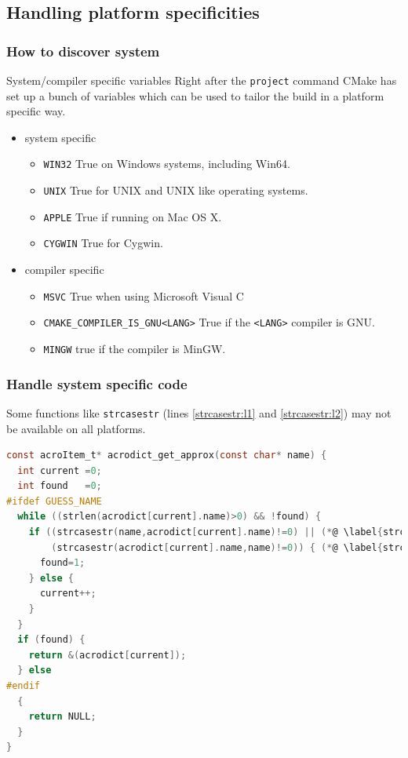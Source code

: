 \documentclass[compress,slidestop,table
              ]
               {beamer}
\begin{document}
\subsection{Handling platform specificities}
\begin{frame}[fragile]
\frametitle{How to discover system}
\begin{block}{System/compiler specific variables}
Right after the \lstinline!project! command CMake has set up
a bunch of variables which can be used to tailor
the build in a platform specific way.
\end{block}
\lstset{basicstyle=\small}
\begin{itemize}
\item system specific
\begin{itemize}
\item \lstinline!WIN32! True on Windows systems, including Win64.
\item \lstinline!UNIX! True for UNIX and UNIX like operating systems.
\item \lstinline!APPLE! True if running on Mac OS X.
\item \lstinline!CYGWIN! True for Cygwin.
\end{itemize}
\item compiler specific
\begin{itemize}
\item \lstinline!MSVC! True when using Microsoft Visual C
\item \lstinline!CMAKE_COMPILER_IS_GNU<LANG>! True if the \lstinline!<LANG>! compiler is GNU.
\item \lstinline!MINGW! true if the compiler is MinGW.
\end{itemize}
\end{itemize}
\lstset{basicstyle=\normalsize}
\end{frame}

\begin{frame}[fragile]
\frametitle{Handle system specific code}
Some functions like \lstinline[language=C]!strcasestr!
(lines \ref{strcasestr:l1} and \ref{strcasestr:l2}) may not be available
on all platforms.
\begin{lstlisting}[language=C,basicstyle=\tiny,xleftmargin=1cm,xrightmargin=1cm,caption=excerpt from acrodict.c]
const acroItem_t* acrodict_get_approx(const char* name) {
  int current =0;
  int found   =0;
#ifdef GUESS_NAME
  while ((strlen(acrodict[current].name)>0) && !found) {
    if ((strcasestr(name,acrodict[current].name)!=0) || (*@ \label{strcasestr:l1} @*)
        (strcasestr(acrodict[current].name,name)!=0)) { (*@ \label{strcasestr:l2} @*)
      found=1;
    } else {
      current++;
    }
  }
  if (found) {
    return &(acrodict[current]);
  } else
#endif
  {
    return NULL;
  }
}
\end{lstlisting}
\end{frame}
\end{document}

